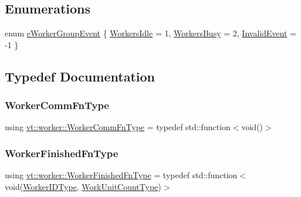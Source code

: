 \subsection*{Enumerations}
\begin{DoxyCompactItemize}
\item 
enum \hyperlink{namespacevt_1_1worker_abcb798436f1cdc4fab035def5b912d1f}{e\+Worker\+Group\+Event} \{ \hyperlink{namespacevt_1_1worker_abcb798436f1cdc4fab035def5b912d1fa68281452752219b980c9dd7ef992c5bb}{Workers\+Idle} = 1, 
\hyperlink{namespacevt_1_1worker_abcb798436f1cdc4fab035def5b912d1fa8fc7a20c67c347c2e4febd57b5200a35}{Workers\+Busy} = 2, 
\hyperlink{namespacevt_1_1worker_abcb798436f1cdc4fab035def5b912d1fa5fc49f06411bbb619911dce051644416}{Invalid\+Event} = -\/1
 \}
\end{DoxyCompactItemize}


\subsection{Typedef Documentation}
\mbox{\label{namespacevt_1_1worker_af5cc6dd44a4444b2e5498ca279a9f04d}} 
\subsubsection{\texorpdfstring{Worker\+Comm\+Fn\+Type}{WorkerCommFnType}}
{\footnotesize\ttfamily using \hyperlink{namespacevt_1_1worker_af5cc6dd44a4444b2e5498ca279a9f04d}{vt\+::worker\+::\+Worker\+Comm\+Fn\+Type} = typedef std\+::function$<$void()$>$}

\mbox{\label{namespacevt_1_1worker_ae32a174a5348d27aafe73c2debea1a94}} 
\subsubsection{\texorpdfstring{Worker\+Finished\+Fn\+Type}{WorkerFinishedFnType}}
{\footnotesize\ttfamily using \hyperlink{namespacevt_1_1worker_ae32a174a5348d27aafe73c2debea1a94}{vt\+::worker\+::\+Worker\+Finished\+Fn\+Type} = typedef std\+::function$<$void(\hyperlink{namespacevt_a656e362091da17b9b93d0655b36e3392}{Worker\+I\+D\+Type}, \hyperlink{namespacevt_1_1worker_a8080c49350b0520151601a8b24d6c6cf}{Work\+Unit\+Count\+Type})$>$}

